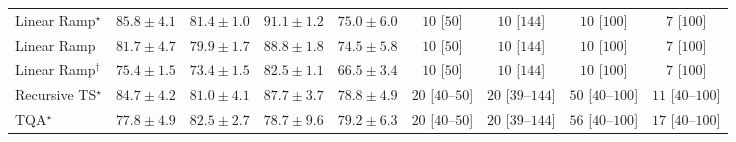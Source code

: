 \begin{tabular}{l|cccc|cccc|}
Linear Ramp$^\star$ & {\cellcolor[HTML]{84248A}} \color[HTML]{F1F1F1} $85.8\pm 4.1$ & {\cellcolor[HTML]{894CA2}} \color[HTML]{F1F1F1} $81.4\pm 1.0$ & {\cellcolor[HTML]{62065F}} \color[HTML]{F1F1F1} $91.1\pm 1.2$ & {\cellcolor[HTML]{8C80BB}} \color[HTML]{F1F1F1} $75.0\pm 6.0$ & {\cellcolor[HTML]{FFF7F3}} \color[HTML]{000000} $10$ [$50$] & {\cellcolor[HTML]{FFF7F3}} \color[HTML]{000000} $10$ [$144$] & {\cellcolor[HTML]{FFF7F3}} \color[HTML]{000000} $10$ [$100$] & {\cellcolor[HTML]{FFF7F3}} \color[HTML]{000000} $7$ [$100$] \\
Linear Ramp & {\cellcolor[HTML]{8949A1}} \color[HTML]{F1F1F1} $81.7\pm 4.7$ & {\cellcolor[HTML]{8A58A8}} \color[HTML]{F1F1F1} $79.9\pm 1.7$ & {\cellcolor[HTML]{790D75}} \color[HTML]{F1F1F1} $88.8\pm 1.8$ & {\cellcolor[HTML]{8C84BD}} \color[HTML]{F1F1F1} $74.5\pm 5.8$ & {\cellcolor[HTML]{FFF7F3}} \color[HTML]{000000} $10$ [$50$] & {\cellcolor[HTML]{FFF7F3}} \color[HTML]{000000} $10$ [$144$] & {\cellcolor[HTML]{FFF7F3}} \color[HTML]{000000} $10$ [$100$] & {\cellcolor[HTML]{FFF7F3}} \color[HTML]{000000} $7$ [$100$] \\
Linear Ramp$^\dagger$ & {\cellcolor[HTML]{8C7CB9}} \color[HTML]{F1F1F1} $75.4\pm 1.5$ & {\cellcolor[HTML]{8C8CC1}} \color[HTML]{F1F1F1} $73.4\pm 1.5$ & {\cellcolor[HTML]{88439E}} \color[HTML]{F1F1F1} $82.5\pm 1.1$ & {\cellcolor[HTML]{A1BEDB}} \color[HTML]{000000} $66.5\pm 3.4$ & {\cellcolor[HTML]{FFF7F3}} \color[HTML]{000000} $10$ [$50$] & {\cellcolor[HTML]{FFF7F3}} \color[HTML]{000000} $10$ [$144$] & {\cellcolor[HTML]{FFF7F3}} \color[HTML]{000000} $10$ [$100$] & {\cellcolor[HTML]{FFF7F3}} \color[HTML]{000000} $7$ [$100$] \\
Recursive TS$^\star$ & {\cellcolor[HTML]{852F91}} \color[HTML]{F1F1F1} $84.7\pm 4.2$ & {\cellcolor[HTML]{894FA3}} \color[HTML]{F1F1F1} $81.0\pm 4.1$ & {\cellcolor[HTML]{81127E}} \color[HTML]{F1F1F1} $87.7\pm 3.7$ & {\cellcolor[HTML]{8B61AC}} \color[HTML]{F1F1F1} $78.8\pm 4.9$ & {\cellcolor[HTML]{FFF4F0}} \color[HTML]{000000} $20$ [$40$--$50$] & {\cellcolor[HTML]{FFF4F0}} \color[HTML]{000000} $20$ [$39$--$144$] & {\cellcolor[HTML]{FEEEEA}} \color[HTML]{000000} $50$ [$40$--$100$] & {\cellcolor[HTML]{FFF6F2}} \color[HTML]{000000} $11$ [$40$--$100$] \\
TQA$^\star$ & {\cellcolor[HTML]{8C69B0}} \color[HTML]{F1F1F1} $77.8\pm 4.9$ & {\cellcolor[HTML]{88439E}} \color[HTML]{F1F1F1} $82.5\pm 2.7$ & {\cellcolor[HTML]{8B61AC}} \color[HTML]{F1F1F1} $78.7\pm 9.6$ & {\cellcolor[HTML]{8B5DAA}} \color[HTML]{F1F1F1} $79.2\pm 6.3$ & {\cellcolor[HTML]{FFF4F0}} \color[HTML]{000000} $20$ [$40$--$50$] & {\cellcolor[HTML]{FFF4F0}} \color[HTML]{000000} $20$ [$39$--$144$] & {\cellcolor[HTML]{FEECE9}} \color[HTML]{000000} $56$ [$40$--$100$] & {\cellcolor[HTML]{FFF5F1}} \color[HTML]{000000} $17$ [$40$--$100$] \\

\end{tabular}
